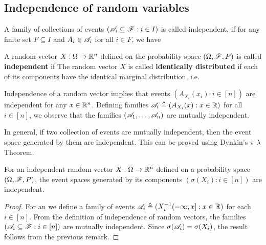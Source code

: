 \documentclass[letterpaper,10pt,english]{article}
\begin{document}
\subsection{Independence of random variables}
\begin{defn}
A family of collections of events $(\mathscr{A}_i \subseteq \mathscr{F}: i \in I)$ is called independent,
if for any finite set $F \subseteq I$ and $A_i \in \mathscr{A}_i$ for all $i \in F$, we have 
\end{defn}
\begin{defn}
A random vector $X: \Omega \to \mathbb{R}^n$ defined on the probability space $(\Omega, \mathscr{F}, P)$ is called \textbf{independent} if 
The random vector $X$ is called \textbf{identically distributed} if each of its components have the identical marginal distribution, i.e.
\end{defn}
\begin{rem}
Independence of a random vector implies that events $(A_{X_i}(x_i): i \in [n])$ are independent for any $x \in \mathbb{R}^n$. 
Defining families $\mathscr{A}_i \triangleq (A_{X_i}(x): x \in \mathbb{R})$ for all $i \in [n]$, 
we observe that the families $(\mathscr{A}_1, \dots, \mathscr{A}_n)$ are mutually independent. 
\end{rem}
\begin{rem}
In general, if two collection of events are mutually independent, then the event space generated by them are independent. 
This can be proved using Dynkin's $\pi$-$\lambda$ Theorem. 
\end{rem}
\begin{thm}
For an independent random vector $X: \Omega \to \mathbb{R}^n$ defined on a probability space $(\Omega, \mathscr{F}, P)$, 
the event spaces generated by its components $(\sigma(X_i): i \in [n])$ are independent.   
\end{thm}
\begin{proof}
For an we define a family of events $\mathscr{A}_i \triangleq (X_i^{-1}(-\infty, x]: x\in \mathbb{R})$ for each $i \in [n]$. 
From the definition of independence of random vectors, 
the families $(\mathscr{A}_i \subseteq \mathscr{F}: i \in [n])$ are mutually independent. 
Since $\sigma(\mathscr{A}_i) = \sigma(X_i)$, 
the result follows from the previous remark. 
\end{proof}
\end{document}
